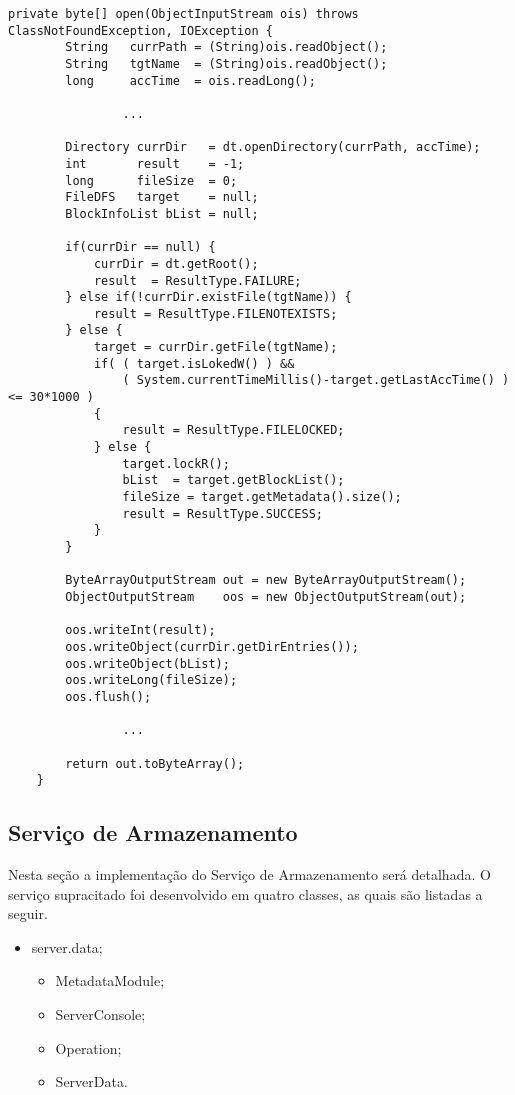 \begin{lstlisting}[basicstyle=\ttfamily\footnotesize, frame=single, caption=Exemplo de método da classe ServerMeta, label=code:serv_meta_open]		
	private byte[] open(ObjectInputStream ois) throws ClassNotFoundException, IOException {
		String   currPath = (String)ois.readObject();
		String   tgtName  = (String)ois.readObject();
		long     accTime  = ois.readLong();
		
				...
		
		Directory currDir   = dt.openDirectory(currPath, accTime);
		int       result    = -1;
		long      fileSize  = 0;
		FileDFS   target    = null;
		BlockInfoList bList = null;
		
		if(currDir == null) {
			currDir = dt.getRoot();
			result  = ResultType.FAILURE;
		} else if(!currDir.existFile(tgtName)) {
			result = ResultType.FILENOTEXISTS;
		} else {
			target = currDir.getFile(tgtName);
			if( ( target.isLokedW() ) &&
				( System.currentTimeMillis()-target.getLastAccTime() ) <= 30*1000 ) 
			{
				result = ResultType.FILELOCKED;
			} else {
				target.lockR();
				bList  = target.getBlockList();
				fileSize = target.getMetadata().size();
				result = ResultType.SUCCESS;
			}
		}
	
		ByteArrayOutputStream out = new ByteArrayOutputStream();
		ObjectOutputStream    oos = new ObjectOutputStream(out);
	
		oos.writeInt(result);
		oos.writeObject(currDir.getDirEntries());
		oos.writeObject(bList);
		oos.writeLong(fileSize);
		oos.flush();
		
				...
					
		return out.toByteArray();
	}
\end{lstlisting}


\subsection{Serviço de Armazenamento}
Nesta seção a implementação do Serviço de Armazenamento será detalhada. O serviço supracitado foi desenvolvido em quatro classes, as quais são listadas a seguir.
\\

\begin{itemize}
	\item server.data;
	\begin{itemize}
	\item MetadataModule;
	\item ServerConsole;
	\item Operation;
	\item ServerData.
	\end{itemize}
\end{itemize}

